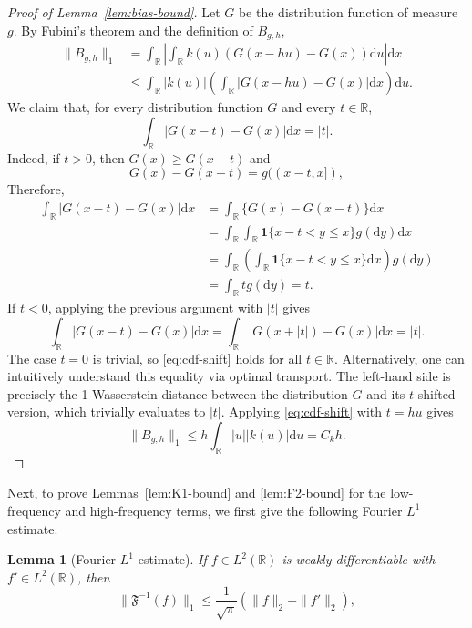 \documentclass[english, 11pt]{article}
\newcommand{\mrd}{\mathrm{d}}
\theoremstyle{plain}
\newtheorem{lemma}[theorem]{Lemma}
\theoremstyle{definition}
\theoremstyle{remark}
\begin{document}
\begin{appendix}
\begin{proof}[Proof of Lemma~\ref{lem:bias-bound}]
Let $G$ be the distribution function of measure $g$. By Fubini's theorem and the definition of $B_{g,h}$,
\begin{align*}
\|B_{g,h}\|_1
&=\int_{\mathbb R}\left|\int_{\mathbb R} k(u)\left(G(x-hu)-G(x)\right) \mrd u\right|\mrd x \\
&\le\int_{\mathbb R}|k(u)|\left(\int_{\mathbb R}|G(x-hu)-G(x)|\mrd x\right)\mrd u.
\end{align*}
We claim that, for every distribution function $G$ and every $t\in\mathbb R$,
\begin{equation}\label{eq:cdf-shift}
\int_{\mathbb R}|G(x-t)-G(x)|\mrd x = |t|.
\end{equation}
Indeed, if $t>0$, then $G(x)\ge G(x-t)$ and
\begin{equation*}
G(x)-G(x-t)=g((x-t,x]),
\end{equation*}
Therefore,
\begin{align*}
\int_{\mathbb R}|G(x-t)-G(x)|\mrd x
&=\int_{\mathbb R}\{G(x)-G(x-t)\}\mrd x \\
&=\int_{\mathbb R}\int_{\mathbb R}\mathbf 1\{x-t<y\le x\}g(\mrd y)\mrd x \\
&=\int_{\mathbb R}\left(\int_{\mathbb R}\mathbf 1\{x-t<y\le x\}\mrd x\right) g(\mrd y) \\
&=\int_{\mathbb R} t g(\mrd y)=t.
\end{align*}
If $t<0$, applying the previous argument with $|t|$ gives
\begin{equation*}
\int_{\mathbb R}|G(x-t)-G(x)|\mrd x=\int_{\mathbb R}|G(x+|t|)-G(x)|\mrd x = |t|.
\end{equation*}
The case $t=0$ is trivial, so \eqref{eq:cdf-shift} holds for all $t\in\mathbb R$. Alternatively, one can intuitively understand this equality via optimal transport. The left-hand side is precisely the 1-Wasserstein distance between the distribution $G$ and its $t$-shifted version, which trivially evaluates to $|t|$.
Applying \eqref{eq:cdf-shift} with $t=hu$ gives
\begin{equation*}
\|B_{g,h}\|_1 \le h\int_{\mathbb R}|u| |k(u)| \mrd u = C_k h.
\end{equation*}
\end{proof}

Next, to prove Lemmas~\ref{lem:K1-bound} and \ref{lem:F2-bound} for the low-frequency and high-frequency terms, we first give the following Fourier $L^1$ estimate.

\begin{lemma}[Fourier $L^1$ estimate]\label{lem:fourier-L1}
If $f\in L^2(\mathbb R)$ is weakly differentiable with $f'\in L^2(\mathbb R)$, then
\begin{equation*}
\|\mathfrak F^{-1} (f)\|_1 \le \frac{1}{\sqrt{\pi}} \left( \|f\|_2+\|f'\|_2\right),
\end{equation*}
\end{lemma}


\end{appendix}
\end{document}
